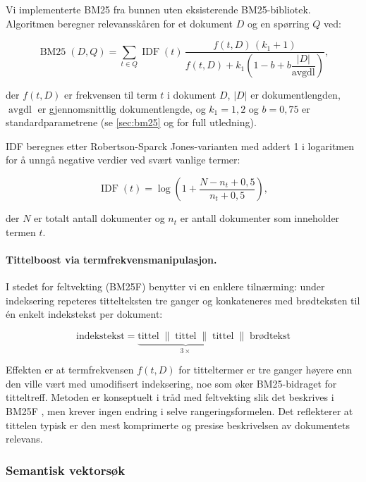 Vi implementerte BM25 fra bunnen uten eksisterende BM25-bibliotek. Algoritmen
beregner relevansskåren for et dokument $D$ og en spørring $Q$ ved:

\begin{equation}
\operatorname{BM25}(D,Q)
=
\sum_{t \in Q}
\operatorname{IDF}(t)\,
\frac{f(t,D)\,(k_1+1)}
{f(t,D) + k_1\!\left(1-b + b\dfrac{|D|}{\operatorname{avgdl}}\right)},
\end{equation}

der $f(t,D)$ er frekvensen til term $t$ i dokument $D$, $|D|$ er
dokumentlengden, $\operatorname{avgdl}$ er gjennomsnittlig dokumentlengde, og
$k_1 = 1{,}2$ og $b = 0{,}75$ er standardparametrene (se \autoref{sec:bm25}
og \cite{robertson2009bm25} for full utledning).

IDF beregnes etter Robertson-Sparck Jones-varianten med addert 1 i logaritmen
for å unngå negative verdier ved svært vanlige termer:

\begin{equation}
\operatorname{IDF}(t)
=
\log\!\left(1 + \frac{N - n_t + 0{,}5}{n_t + 0{,}5}\right),
\end{equation}

der $N$ er totalt antall dokumenter og $n_t$ er antall dokumenter som
inneholder termen $t$.

\paragraph{Tittelboost via termfrekvensmanipulasjon.}
I stedet for feltvekting (BM25F) benytter vi en enklere tilnærming: under
indeksering repeteres tittelteksten tre ganger og konkateneres med brødteksten
til én enkelt indekstekst per dokument:

\[
\text{indekstekst} = \underbrace{\text{tittel} \;\|\; \text{tittel} \;\|\; \text{tittel}}_{3\times} \;\|\; \text{brødtekst}
\]

Effekten er at termfrekvensen $f(t,D)$ for titteltermer er tre ganger høyere
enn den ville vært med umodifisert indeksering, noe som øker BM25-bidraget
for titteltreff. Metoden er konseptuelt i tråd med feltvekting slik det
beskrives i BM25F \cite{robertson2009bm25}, men krever ingen endring i
selve rangeringsformelen. Det reflekterer at tittelen typisk er den mest
komprimerte og presise beskrivelsen av dokumentets relevans.

\subsubsection{Semantisk vektorsøk}
\label{sec:semantisk-impl}

